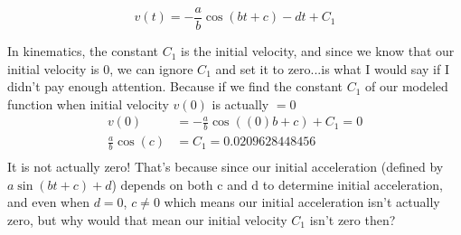 \documentclass[12pt]{article}
\begin{document}
\begin{equation}
    v(t) = -\frac{a}{b}\cos(bt+c) - dt + C_{1}
\end{equation}


In kinematics, the constant $C_{1}$ is the initial velocity, and since we know that our initial velocity is 0, we can ignore $C_{1}$ and set it to zero...is what I would say if I didn't pay enough attention.
Because if we find the constant $C_{1}$ of our modeled function when initial velocity $v(0)$ is actually $= 0$
\begin{align}
    v(0) &= -\frac{a}{b}\cos(\left(0\right)b+c) + C_{1} = 0 \\
    \frac{a}{b}\cos(c) &= C_{1} = 0.0209628448456 \\
\end{align}
It is not actually zero! That's because since our initial acceleration (defined by $a\sin(bt+c) + d$) depends on both c and d to determine initial acceleration, and even when $d=0$, $c \neq 0$ which means our initial acceleration isn't actually zero, but why would that mean our initial velocity $C_{1}$ isn't zero then?


%
%
%
%
\end{document}
